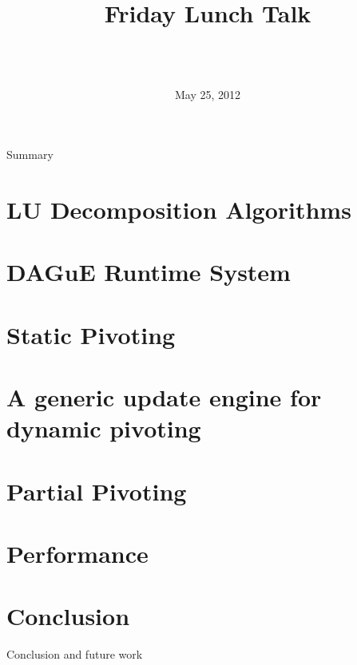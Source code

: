 \documentclass{beamer}
\title[LU Decompositions over DAGuE]{
        {\bfseries \projet\\} 
        {\bfseries \huge \sujet}
        {\small Friday Lunch Talk}
}
\date{May 25, 2012}
\author[Zenati]{
  {\normalsize \bfseries \sffamily} {\large \gA}\\
  \vspace{1cm}
  {\normalsize \bfseries \sffamily} {\large \gB}\\
}
\begin{document}
\begin{frame}
\maketitle
\end{frame}

\begin{frame}{Summary}
\tableofcontents
\end{frame}


\section[LU Algorithms]{LU Decomposition Algorithms}


\section[DAGuE]{DAGuE Runtime System}


\section{Static Pivoting}



\section[Generic Update]{A generic update engine for dynamic pivoting}


\section{Partial Pivoting}


\section{Performance}


\section*{Conclusion}
\begin{frame}{Conclusion and future work}
\end{frame}
\end{document}
